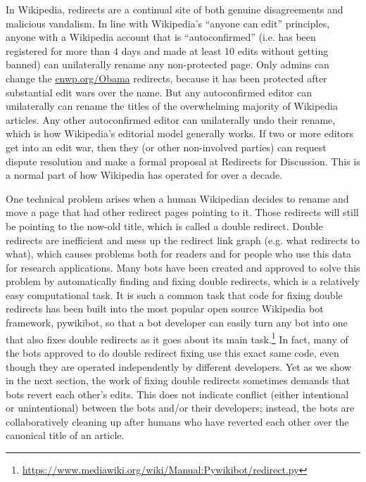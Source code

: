 \documentclass[format=acmsmall, review=false, screen=true]{acmart}%
\begin{document}
In Wikipedia, redirects are a continual site of both genuine disagreements and malicious vandalism. In line with Wikipedia's ``anyone can edit'' principles, anyone with a Wikipedia account that is ``autoconfirmed'' (i.e. has been registered for more than 4 days and made at least 10 edits without getting banned) can unilaterally rename any non-protected page. Only admins can change the \url{enwp.org/Obama} redirects, because it has been protected after substantial edit wars over the name. But any autoconfirmed editor can unilaterally can rename the titles of the overwhelming majority of Wikipedia articles. Any other autoconfirmed editor can unilaterally undo their rename, which is how Wikipedia's editorial model generally works. If two or more editors get into an edit war, then they (or other non-involved parties) can request dispute resolution and make a formal proposal at Redirects for Discussion. This is a normal part of how Wikipedia has operated for over a decade.

One technical problem arises when a human Wikipedian decides to rename and move a page that had other redirect pages pointing to it. Those redirects will still be pointing to the now-old title, which is called a double redirect. Double redirects are inefficient and mess up the redirect link graph (e.g. what redirects to what), which causes problems both for readers and for people who use this data for research applications. Many bots have been created and approved to solve this problem by automatically finding and fixing double redirects, which is a relatively easy computational task. It is such a common task that code for fixing double redirects has been built into the most popular open source Wikipedia bot framework, pywikibot, so that a bot developer can easily turn any bot into one that also fixes double redirects as it goes about its main task.\footnote{ \url{https://www.mediawiki.org/wiki/Manual:Pywikibot/redirect.py}} In fact, many of the bots approved to do double redirect fixing use this exact same code, even though they are operated independently by different developers. Yet as we show in the next section, the work of fixing double redirects sometimes demands that bots revert each other's edits. This does not indicate conflict (either intentional or unintentional) between the bots and/or their developers; instead, the bots are collaboratively cleaning up after humans who have reverted each other over the canonical title of an article. 
\end{document}
